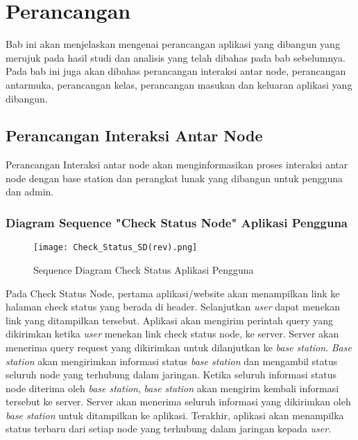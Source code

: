 \chapter{Perancangan}
\label{chap:perancangan}

Bab ini akan menjelaskan mengenai perancangan aplikasi yang dibangun yang merujuk pada hasil studi dan analisis yang telah dibahas pada bab sebelumnya. Pada bab ini juga akan dibahas perancangan interaksi antar node, perancangan antarmuka, perancangan kelas, perancangan masukan dan keluaran aplikasi yang dibangun.

\section{Perancangan Interaksi Antar Node}
\label{sec:skripsi} 
Perancangan Interaksi antar node akan menginformasikan proses interaksi antar node dengan base station dan perangkat lunak yang dibangun untuk pengguna dan admin.

   \subsection{Diagram Sequence "Check Status Node" Aplikasi Pengguna}
   
   \begin{figure}[H]
    	\centering  
    	\texttt{[image: Check\_Status\_SD(rev).png]}  
    	\caption[Sequence Diagram Check Status Aplikasi Pengguna]{Sequence Diagram Check Status Aplikasi Pengguna} 
    	\label{fig:Sequence Diagram Check Status Aplikasi Pengguna} 
    \end{figure}
   
   Pada Check Status Node, pertama aplikasi/website akan menampilkan link ke halaman check status yang berada di header. Selanjutkan \textit{user} dapat menekan link yang ditampilkan tersebut. Aplikasi akan mengirim perintah query yang dikirimkan ketika \textit{user} menekan link check status node, ke server. Server akan menerima query request yang dikirimkan untuk dilanjutkan ke \textit{base station}. \textit{Base station} akan mengirimkan informasi status \textit{base station} dan mengambil status seluruh node yang terhubung dalam jaringan. Ketika seluruh informasi status node diterima oleh \textit{base station}, \textit{base station} akan mengirim kembali informasi tersebut ke server. Server akan menerima seluruh informasi yang dikirimkan oleh \textit{base station} untuk ditampilkan ke aplikasi. Terakhir, aplikasi akan menampilka status terbaru dari setiap node yang terhubung dalam jaringan kepada \textit{user}.
   
